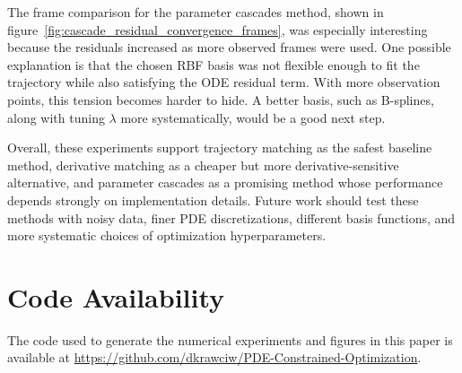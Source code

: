 \documentclass{article}
\begin{document}
The frame comparison for the parameter cascades method, shown in figure~\ref{fig:cascade_residual_convergence_frames}, was especially interesting because the residuals increased as more observed frames were used. One possible explanation is that the chosen RBF basis was not flexible enough to fit the trajectory while also satisfying the ODE residual term. With more observation points, this tension becomes harder to hide. A better basis, such as B-splines, along with tuning $\lambda$ more systematically, would be a good next step.

Overall, these experiments support trajectory matching as the safest baseline method, derivative matching as a cheaper but more derivative-sensitive alternative, and parameter cascades as a promising method whose performance depends strongly on implementation details. Future work should test these methods with noisy data, finer PDE discretizations, different basis functions, and more systematic choices of optimization hyperparameters.




\section*{Code Availability}

  The code used to generate the numerical experiments and figures in this paper is available at
  \url{https://github.com/dkrawciw/PDE-Constrained-Optimization}.
\end{document}
